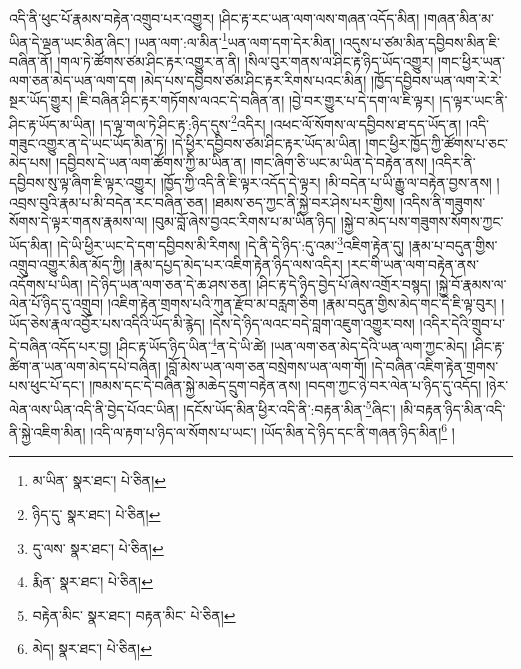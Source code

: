 འདི་ནི་ཕུང་པོ་རྣམས་བརྟེན་འགྲུབ་པར་འགྱུར། །ཤིང་རྟ་རང་ཡན་ལག་ལས་གཞན་འདོད་མིན། །གཞན་མིན་མ་ཡིན་དེ་ལྡན་ཡང་མིན་ཞིང་། །ཡན་ལག་:ལ་མིན་\footnote{མ་ཡིན་  སྣར་ཐང་།  པེ་ཅིན། }ཡན་ལག་དག་དེར་མིན། །འདུས་པ་ཙམ་མིན་དབྱིབས་མིན་ཇི་བཞིན་ནོ། །གལ་ཏེ་ཚོགས་ཙམ་ཤིང་རྟར་འགྱུར་ན་ནི། །སིལ་བུར་གནས་ལ་ཤིང་རྟ་ཉིད་ཡོད་འགྱུར། །གང་ཕྱིར་ཡན་ལག་ཅན་མེད་ཡན་ལག་དག །མེད་པས་དབྱིབས་ཙམ་ཤིང་རྟར་རིགས་པའང་མིན། །ཁྱོད་དབྱིབས་ཡན་ལག་རེ་རེ་སྔར་ཡོད་གྱུར། །ཇི་བཞིན་ཤིང་རྟར་གཏོགས་ལའང་དེ་བཞིན་ན། །བྱེ་བར་གྱུར་པ་དེ་དག་ལ་ཇི་ལྟར། །ད་ལྟར་ཡང་ནི་ཤིང་རྟ་ཡོད་མ་ཡིན། །ད་ལྟ་གལ་ཏེ་ཤིང་རྟ་:ཉིད་དུས་\footnote{ཉིད་དུ་  སྣར་ཐང་།  པེ་ཅིན། }འདིར། །འཕང་ལོ་སོགས་ལ་དབྱིབས་ཐ་དད་ཡོད་ན། །འདི་གཟུང་འགྱུར་ན་དེ་ཡང་ཡོད་མིན་ཏེ། །དེ་ཕྱིར་དབྱིབས་ཙམ་ཤིང་རྟར་ཡོད་མ་ཡིན། །གང་ཕྱིར་ཁྱོད་ཀྱི་ཚོགས་པ་ཅང་མེད་པས། །དབྱིབས་དེ་ཡན་ལག་ཚོགས་ཀྱི་མ་ཡིན་ན། །གང་ཞིག་ཅི་ཡང་མ་ཡིན་དེ་བརྟེན་ནས། །འདིར་ནི་དབྱིབས་སུ་ལྟ་ཞིག་ཇི་ལྟར་འགྱུར། །ཁྱོད་ཀྱི་འདི་ནི་ཇི་ལྟར་འདོད་དེ་ལྟར། །མི་བདེན་པ་ཡི་རྒྱུ་ལ་བརྟེན་བྱས་ནས། །འབྲས་བུའི་རྣམ་པ་མི་བདེན་རང་བཞིན་ཅན། །ཐམས་ཅད་ཀྱང་ནི་སྐྱེ་བར་ཤེས་པར་གྱིས། །འདིས་ནི་གཟུགས་སོགས་དེ་ལྟར་གནས་རྣམས་ལ། །བུམ་བློ་ཞེས་བྱའང་རིགས་པ་མ་ཡིན་ཉིད། །སྐྱེ་བ་མེད་པས་གཟུགས་སོགས་ཀྱང་ཡོད་མིན། །དེ་ཡི་ཕྱིར་ཡང་དེ་དག་དབྱིབས་མི་རིགས། །དེ་ནི་དེ་ཉིད་:དུ་འམ་\footnote{དུ་ལས་  སྣར་ཐང་།  པེ་ཅིན། }འཇིག་རྟེན་དུ། །རྣམ་པ་བདུན་གྱིས་འགྲུབ་འགྱུར་མིན་མོད་ཀྱི། །རྣམ་དཔྱད་མེད་པར་འཇིག་རྟེན་ཉིད་ལས་འདིར། །རང་གི་ཡན་ལག་བརྟེན་ནས་འདོགས་པ་ཡིན། །དེ་ཉིད་ཡན་ལག་ཅན་དེ་ཆ་ཤས་ཅན། །ཤིང་རྟ་དེ་ཉིད་བྱེད་པོ་ཞེས་འགྲོར་བསྙད། །སྐྱེ་བོ་རྣམས་ལ་ལེན་པོ་ཉིད་དུ་འགྲུབ། །འཇིག་རྟེན་གྲགས་པའི་ཀུན་རྫོབ་མ་བརླག་ཅིག །རྣམ་བདུན་གྱིས་མེད་གང་དེ་ཇི་ལྟ་བུར། །ཡོད་ཅེས་རྣལ་འབྱོར་པས་འདིའི་ཡོད་མི་རྙེད། །དེས་དེ་ཉིད་ལའང་བདེ་བླག་འཇུག་འགྱུར་བས། །འདིར་དེའི་གྲུབ་པ་དེ་བཞིན་འདོད་པར་བྱ། །ཤིང་རྟ་ཡོད་ཉིད་ཡིན་\footnote{རྨིན་  སྣར་ཐང་།  པེ་ཅིན། }ན་དེ་ཡི་ཚེ། །ཡན་ལག་ཅན་མེད་དེའི་ཡན་ལག་ཀྱང་མེད། །ཤིང་རྟ་ཚིག་ན་ཡན་ལག་མེད་དཔེ་བཞིན། །བློ་མེས་ཡན་ལག་ཅན་བསྲེགས་ཡན་ལག་གོ། །དེ་བཞིན་འཇིག་རྟེན་གྲགས་པས་ཕུང་པོ་དང་། །ཁམས་དང་དེ་བཞིན་སྐྱེ་མཆེད་དྲུག་བརྟེན་ནས། །བདག་ཀྱང་ཉེ་བར་ལེན་པ་ཉིད་དུ་འདོད། །ཉེར་ལེན་ལས་ཡིན་འདི་ནི་བྱེད་པོའང་ཡིན། །དངོས་ཡོད་མིན་ཕྱིར་འདི་ནི་:བརྟན་མིན་\footnote{བརྟེན་མིང་  སྣར་ཐང་། བརྟན་མིང་  པེ་ཅིན། }ཞིང་། །མི་བརྟན་ཉིད་མིན་འདི་ནི་སྐྱེ་འཇིག་མིན། །འདི་ལ་རྟག་པ་ཉིད་ལ་སོགས་པ་ཡང་། །ཡོད་མིན་དེ་ཉིད་དང་ནི་གཞན་ཉིད་མིན།\footnote{མེད།  སྣར་ཐང་།  པེ་ཅིན། } །
